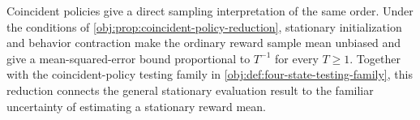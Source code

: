 Coincident policies give a direct sampling interpretation of the same order. Under the conditions of \cref{obj:prop:coincident-policy-reduction}, stationary initialization and behavior contraction make the ordinary reward sample mean unbiased and give a mean-squared-error bound proportional to \(T^{-1}\) for every \(T\geq1\). Together with the coincident-policy testing family in \cref{obj:def:four-state-testing-family}, this reduction connects the general stationary evaluation result to the familiar uncertainty of estimating a stationary reward mean.
